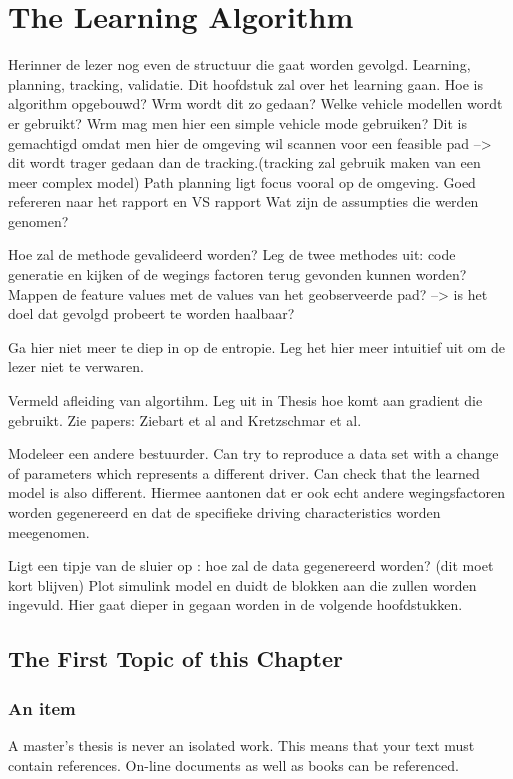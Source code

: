 \chapter{The Learning Algorithm\\}
\label{cha:2}
Herinner de lezer nog even de structuur die gaat worden gevolgd. 
Learning, planning, tracking, validatie.
Dit hoofdstuk zal over het learning gaan.
Hoe is algorithm opgebouwd? Wrm wordt dit zo gedaan?
Welke vehicle modellen wordt er gebruikt? Wrm mag men hier een simple vehicle mode gebruiken?
Dit is gemachtigd omdat men hier de omgeving wil scannen voor een feasible pad --> dit wordt trager gedaan dan de tracking.(tracking zal gebruik maken van een meer complex model) Path planning ligt focus vooral op de omgeving.
Goed refereren naar het rapport en VS rapport
Wat zijn de assumpties die werden genomen?

Hoe zal de methode gevalideerd worden? Leg de twee methodes uit: code generatie en kijken of de wegings factoren terug gevonden kunnen worden? Mappen de feature values met de values van het geobserveerde pad? --> is het doel dat gevolgd probeert te worden haalbaar? 

Ga hier niet meer te diep in op de entropie. Leg het hier meer intuitief uit om de lezer niet te verwaren. 

Vermeld afleiding van algortihm. Leg uit in Thesis hoe komt aan gradient die gebruikt. Zie papers: Ziebart et al and Kretzschmar et al.

Modeleer een andere bestuurder. Can try to reproduce a data set with a change of parameters which represents a different driver. Can check that the learned model is also different. Hiermee aantonen dat er ook echt andere wegingsfactoren worden gegenereerd en dat de specifieke driving characteristics worden meegenomen.

Ligt een tipje van de sluier op : hoe zal de data gegenereerd worden? (dit moet kort blijven)
Plot simulink model en duidt de blokken aan die zullen worden ingevuld. Hier gaat dieper in gegaan worden in de volgende hoofdstukken. 

\section{The First Topic of this Chapter}


\subsection{An item}
A master's thesis is never an isolated work. This means that your text must
contain references. On-line documents\cite{wiki} as well as
books\cite{pratchett06:_good_omens} can be referenced.

